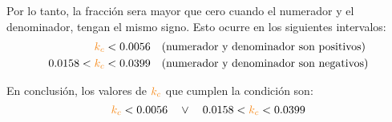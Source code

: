 Por lo tanto, la fracción sera mayor que cero cuando el numerador y el denominador,
tengan el mismo signo. Esto ocurre en los siguientes intervalos:
\begin{align}
  \nara{k_c} &< 0.0056 \quad \text{(numerador y denominador son positivos)} \\
  0.0158 < \nara{k_c} &< 0.0399 \quad \text{(numerador y denominador son negativos)}
\end{align}

En conclusión, los valores de $\nara{k_c}$ que cumplen la condición son:
\begin{equation}
  \nara{k_c} < 0.0056 \quad \lor \quad 0.0158 < \nara{k_c} < 0.0399
\end{equation}


